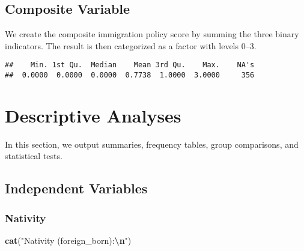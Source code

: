 \documentclass[
]{article}
\newenvironment{Shaded}{\begin{snugshade}}{\end{snugshade}}
\newcommand{\AttributeTok}[1]{\textcolor[rgb]{0.13,0.29,0.53}{#1}}
\newcommand{\CommentTok}[1]{\textcolor[rgb]{0.56,0.35,0.01}{\textit{#1}}}
\newcommand{\ConstantTok}[1]{\textcolor[rgb]{0.56,0.35,0.01}{#1}}
\newcommand{\DecValTok}[1]{\textcolor[rgb]{0.00,0.00,0.81}{#1}}
\newcommand{\FunctionTok}[1]{\textcolor[rgb]{0.13,0.29,0.53}{\textbf{#1}}}
\newcommand{\NormalTok}[1]{#1}
\newcommand{\OtherTok}[1]{\textcolor[rgb]{0.56,0.35,0.01}{#1}}
\newcommand{\SpecialCharTok}[1]{\textcolor[rgb]{0.81,0.36,0.00}{\textbf{#1}}}
\newcommand{\StringTok}[1]{\textcolor[rgb]{0.31,0.60,0.02}{#1}}
\begin{document}
\subsection{Composite Variable}\label{composite-variable}

We create the composite immigration policy score by summing the three
binary indicators. The result is then categorized as a factor with
levels 0--3.

\begin{Shaded}
\end{Shaded}

\begin{verbatim}
##    Min. 1st Qu.  Median    Mean 3rd Qu.    Max.    NA's 
##  0.0000  0.0000  0.0000  0.7738  1.0000  3.0000     356
\end{verbatim}

\section{Descriptive Analyses}\label{descriptive-analyses}

In this section, we output summaries, frequency tables, group
comparisons, and statistical tests.

\subsection{Independent Variables}\label{independent-variables}

\subsubsection{Nativity}\label{nativity-1}

\begin{Shaded}
\begin{Highlighting}[]
\FunctionTok{cat}\NormalTok{(}\StringTok{"Nativity (foreign\_born):}\SpecialCharTok{\textbackslash{}n}\StringTok{"}\NormalTok{)}
\end{Highlighting}
\end{Shaded}
\end{document}
